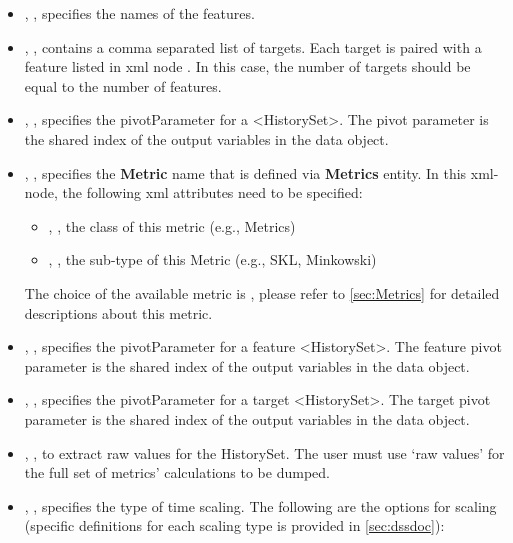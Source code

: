 \begin{itemize}
  \item {}, , specifies the names of the features.
  \item {}, , contains a comma separated list of
    targets. \nb Each target is paired with a feature listed in xml node . In this case, the
    number of targets should be equal to the number of features.
  \item {}, , specifies the pivotParameter for a <HistorySet>.
    The pivot parameter is the shared index of the output variables in the data object.
  \item {}, , specifies the \textbf{Metric} name that is defined via
    \textbf{Metrics} entity. In this xml-node, the following xml attributes need to be specified:
    \begin{itemize}
      \item {}, , the class of this metric (e.g., Metrics)
      \item {}, , the sub-type of this Metric (e.g., SKL, Minkowski)
    \end{itemize}
    \nb The choice of the available metric is , please
    refer to \ref{sec:Metrics} for detailed descriptions about this metric.
    \item {}, , specifies the pivotParameter for a feature <HistorySet>. The feature pivot parameter is the shared index of the output variables in the data object.
    \item {}, , specifies the pivotParameter for a target <HistorySet>. The target pivot parameter is the shared index of the output variables in the data object.
    \item {}, , to extract raw values for the HistorySet. The user must use ‘raw values’ for the full set of metrics’ calculations to be dumped.
    \item {}, , specifies the type of time scaling. The following are the options for scaling (specific definitions for each scaling type is provided in \ref{sec:dssdoc}):

\end{itemize}
